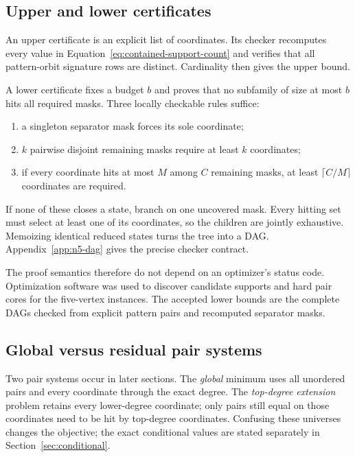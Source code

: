 \subsection{Upper and lower certificates}

An upper certificate is an explicit list of coordinates.  Its checker
recomputes every value in Equation~\eqref{eq:contained-support-count} and
verifies that all pattern-orbit signature rows are distinct.  Cardinality then
gives the upper bound.

A lower certificate fixes a budget $b$ and proves that no subfamily of size at
most $b$ hits all required masks.  Three locally checkable rules suffice:
\begin{enumerate}
  \item a singleton separator mask forces its sole coordinate;
  \item $k$ pairwise disjoint remaining masks require at least $k$
  coordinates;
  \item if every coordinate hits at most $M$ among $C$ remaining masks, at
  least $\lceil C/M\rceil$ coordinates are required.
\end{enumerate}
If none of these closes a state, branch on one uncovered mask.  Every hitting
set must select at least one of its coordinates, so the children are jointly
exhaustive.  Memoizing identical reduced states turns the tree into a DAG.
Appendix~\ref{app:n5-dag} gives the precise checker contract.

The proof semantics therefore do not depend on an optimizer's status code.
Optimization software was used to discover candidate supports and hard pair
cores for the five-vertex instances.  The accepted lower bounds are the
complete DAGs checked from explicit pattern pairs and recomputed separator
masks.

\subsection{Global versus residual pair systems}

Two pair systems occur in later sections.  The \emph{global} minimum uses all
unordered pairs and every coordinate through the exact degree.  The
\emph{top-degree extension} problem retains every lower-degree coordinate;
only pairs still equal on those coordinates need to be hit by top-degree
coordinates.  Confusing these universes changes the objective; the exact
conditional values are stated separately in Section~\ref{sec:conditional}.

